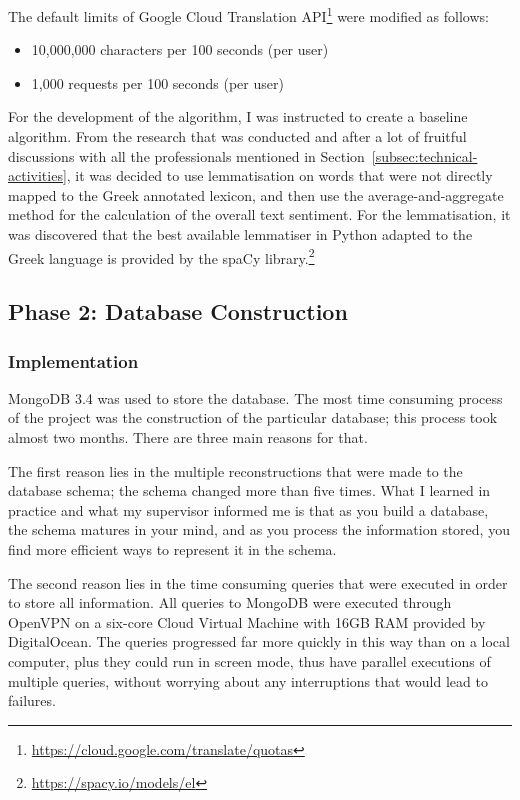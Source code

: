 The default limits of Google Cloud Translation API\footnote {\url {https://cloud.google.com/translate/quotas}} were modified as follows:

\begin{itemize}
 \item 10,000,000 characters per 100 seconds (per user)
 \item 1,000 requests per 100 seconds (per user)
\end{itemize}

For the development of the algorithm,
I was instructed to create a baseline algorithm.
From the research that was conducted and after a lot of fruitful discussions
with all the professionals mentioned
in Section~\ref{subsec:technical-activities},
it was decided to use lemmatisation on words that were not directly mapped
to the Greek annotated lexicon,
and then use the average-and-aggregate method
for the calculation of the overall text sentiment.
For the lemmatisation, it was discovered
that the best available lemmatiser in Python
adapted to the Greek language is provided
by the spaCy library.\footnote{\url {https://spacy.io/models/el}}

\subsection{Phase 2: Database Construction}
\label{subsec:database}

\subsubsection{Implementation}
\label{subsubsec:dbimplementation}

MongoDB 3.4 was used to store the database.
The most time consuming process of the project
was the construction of the particular database;
this process took almost two months.
There are three main reasons for that.

The first reason lies in the multiple reconstructions
that were made to the database schema;
the schema changed more than five times.
What I learned in practice and what my supervisor informed me is
that as you build a database,
the schema matures in your mind,
and as you process the information stored,
you find more efficient ways to represent it in the schema.

The second reason lies in the time consuming queries
that were executed in order to store all information.
All queries to MongoDB were executed through OpenVPN
on a six-core Cloud Virtual Machine with 16GB RAM
provided by DigitalOcean.
The queries progressed far more quickly in this way
than on a local computer, plus they could run
in screen mode, thus have parallel executions of multiple queries,
without worrying about any interruptions
that would lead to failures.

